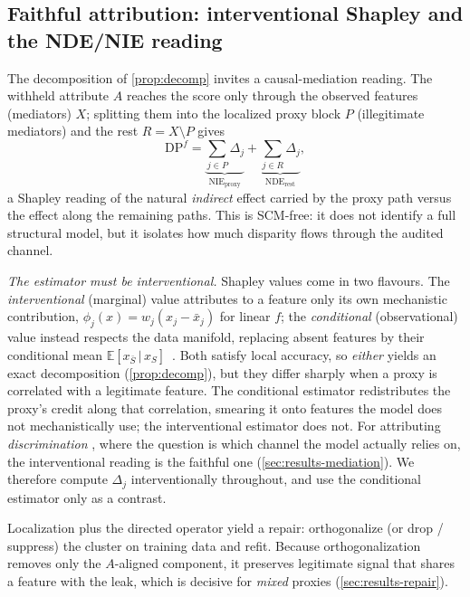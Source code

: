 \documentclass[sn-mathphys-num]{sn-jnl}
\newcommand{\DP}{\mathrm{DP}}
\newcommand{\Exp}{\mathbb{E}}
\newcommand{\given}{\,\vert\,}
\begin{document}
\subsection{Faithful attribution: interventional Shapley and the NDE/NIE reading}
\label{sec:mediation}
The decomposition of \cref{prop:decomp} invites a causal-mediation reading. The
withheld attribute $A$ reaches the score only through the observed features
(mediators) $X$; splitting them into the localized proxy block $P$ (illegitimate
mediators) and the rest $R=X\setminus P$ gives
\begin{equation}
  \DP^f=\underbrace{\textstyle\sum_{j\in P}\Delta_j}_{\text{NIE}_{\text{proxy}}}
        +\underbrace{\textstyle\sum_{j\in R}\Delta_j}_{\text{NDE}_{\text{rest}}},
  \label{eq:nde}
\end{equation}
a Shapley reading of the natural \emph{indirect} effect carried by the proxy path
versus the effect along the remaining paths. This is SCM-free: it does not
identify a full structural model, but it isolates how much disparity flows
through the audited channel.

\emph{The estimator must be interventional.} Shapley values come in two flavours.
The \emph{interventional} (marginal) value attributes to a feature only its own
mechanistic contribution, $\phi_j(x)=w_j(x_j-\bar x_j)$ for linear $f$; the
\emph{conditional} (observational) value instead respects the data manifold,
replacing absent features by their conditional mean $\Exp[x_{\bar S}\given x_S]$~\cite{janzing2020feature,aas2021explaining,heskes2020causal}.
Both satisfy local accuracy, so \emph{either} yields an exact decomposition
(\cref{prop:decomp}), but they differ sharply when a proxy is correlated with a
legitimate feature. The conditional estimator redistributes the proxy's credit
along that correlation, smearing it onto features the model does not mechanistically
use; the interventional estimator does not. For attributing \emph{discrimination}
, where the question is which channel the model actually relies on, the
interventional reading is the faithful one (\cref{sec:results-mediation}). We
therefore compute $\Delta_j$ interventionally throughout, and use the conditional
estimator only as a contrast.


\label{sec:repair}
Localization plus the directed operator yield a repair: orthogonalize (or drop /
suppress) the cluster on training data and refit. Because orthogonalization
removes only the $A$-aligned component, it preserves legitimate signal that
shares a feature with the leak, which is decisive for \emph{mixed} proxies
(\cref{sec:results-repair}).
\end{document}
